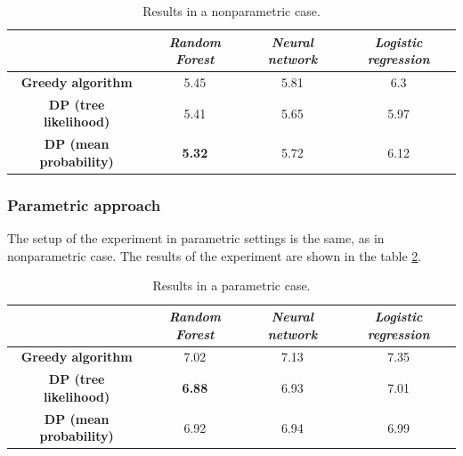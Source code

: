 \documentclass[12pt]{article}
\begin{document}
\begin{table}[!ht]
\centering
\caption{Results in a nonparametric case.}
\label{table-nonparam}
\begin{tabular}{c|c|c|c|}
\cline{2-4}
& \textit{Random Forest} & \textit{Neural network} & \textit{Logistic regression} \\ \hline
\multicolumn{1}{|c|}{\textbf{Greedy algorithm}}      & 5.45                   & 5.81           & 6.3                          \\ \hline
\multicolumn{1}{|c|}{\textbf{DP (tree likelihood)}}  & 5.41                   & 5.65           & 5.97                         \\ \hline
\multicolumn{1}{|c|}{\textbf{DP (mean probability)}} & \textbf{5.32}                   & 5.72           & 6.12                         \\ \hline
\end{tabular}
\end{table}

\subsubsection{Parametric approach}
The setup of the experiment in parametric settings is the same, as in nonparametric case.
The results of the experiment are shown in the table \ref{table-param}.

\begin{table}[!ht]
\centering
\caption{Results in a parametric case.}
\label{table-param}
\begin{tabular}{c|c|c|c|}
\cline{2-4}
& \textit{Random Forest} & \textit{Neural network} & \textit{Logistic regression} \\ \hline
\multicolumn{1}{|c|}{\textbf{Greedy algorithm}}      & 7.02                   & 7.13           & 7.35                          \\ \hline
\multicolumn{1}{|c|}{\textbf{DP (tree likelihood)}}  & \textbf{6.88}                   & 6.93           & 7.01                         \\ \hline
\multicolumn{1}{|c|}{\textbf{DP (mean probability)}} & 6.92                   & 6.94           & 6.99                         \\ \hline
\end{tabular}
\end{table}
\end{document}
